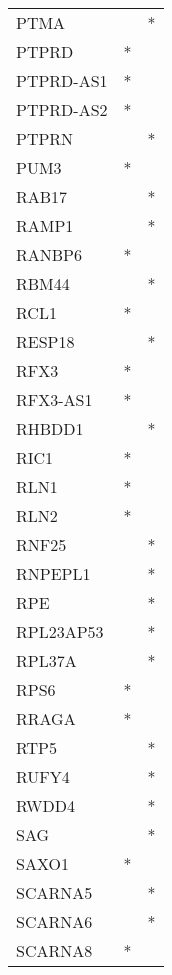 \begin{longtable}{lcc}
PTMA           &           &       * \\
PTPRD          &         * &         \\
PTPRD-AS1      &         * &         \\
PTPRD-AS2      &         * &         \\
PTPRN          &           &       * \\
PUM3           &         * &         \\
RAB17          &           &       * \\
RAMP1          &           &       * \\
RANBP6         &         * &         \\
RBM44          &           &       * \\
RCL1           &         * &         \\
RESP18         &           &       * \\
RFX3           &         * &         \\
RFX3-AS1       &         * &         \\
RHBDD1         &           &       * \\
RIC1           &         * &         \\
RLN1           &         * &         \\
RLN2           &         * &         \\
RNF25          &           &       * \\
RNPEPL1        &           &       * \\
RPE            &           &       * \\
RPL23AP53      &           &       * \\
RPL37A         &           &       * \\
RPS6           &         * &         \\
RRAGA          &         * &         \\
RTP5           &           &       * \\
RUFY4          &           &       * \\
RWDD4          &           &       * \\
SAG            &           &       * \\
SAXO1          &         * &         \\
SCARNA5        &           &       * \\
SCARNA6        &           &       * \\
SCARNA8        &         * &         \\

\end{longtable}
